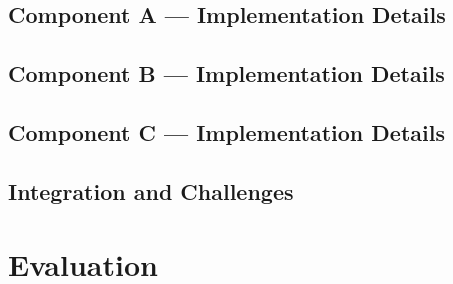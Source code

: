 \documentclass[11pt]{article}
\newif\ifguidance
\newcommand{\guidance}[1]{\ifguidance\textcolor{blue}{\small\textit{[#1]}}\fi}
\begin{document}
\begin{multicols}{2}
\subsection{Component A --- Implementation Details}

\guidance{%
  Describe the implementation of this component. What libraries, models,
  or APIs did you use? What was non-trivial about making it work?}


\subsection{Component B --- Implementation Details}

\guidance{%
  Detail the implementation steps. For a dialogue manager, for example,
  describe the slot-filling loop, prompt engineering, error handling,
  state management, etc.}


\subsection{Component C --- Implementation Details}


\subsection{Integration and Challenges}

\guidance{%
  Describe how the components were integrated into a working system.
  Discuss any significant challenges encountered during development
  and how they were resolved. This demonstrates the depth of work done
  and helps justify the ``significant amount of work'' criterion.}



\section{Evaluation}
\label{sec:evaluation}


\end{multicols}
\end{document}

